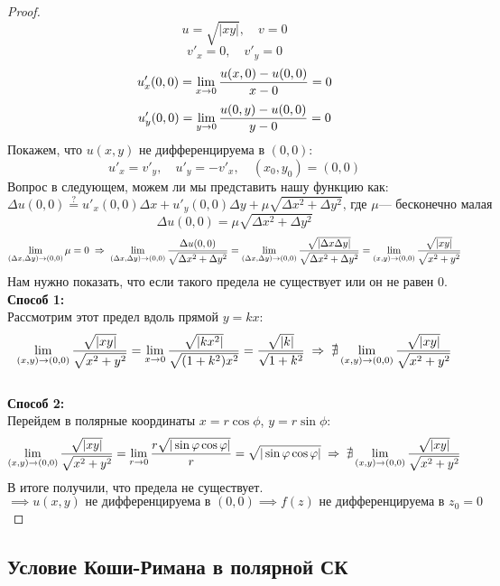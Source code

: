 	\begin{proof}
		\[ u = \sqrt{|xy|}, \quad v = 0 \]
		\[ v'_x = 0, \quad v'_y = 0 \]
		\[ u'_x(0, 0) = \lim\limits_{x \to 0}\frac{u(x, 0) - u(0, 0)}{x - 0} = 0 \]
		\[ u'_y(0, 0) = \lim\limits_{y \to 0}\frac{u(0, y) - u(0, 0)}{y - 0} = 0 \]
		Покажем, что $u(x,y)$ не дифференцируема в $(0, 0)$:
		\[ u'_x = v'_y, \quad u'_y = -v'_x, \quad (x_0, y_0) = (0, 0) \]
		Вопрос в следующем, можем ли мы представить нашу функцию как:
		\[ \Delta u(0, 0) \stackrel{?}{=} u'_x(0, 0)\Delta x + u'_y(0, 0)\Delta y + \mu \sqrt{\Delta x^2 + \Delta y^2} \text{, где } \mu \text{--- бесконечно малая}\]
		\[ \Delta u(0, 0) = \mu \sqrt{\Delta x^2 + \Delta y^2} \]
		\[\lim\limits_{(\Delta x, \Delta y) \to (0, 0) }\mu = 0  \;\Rightarrow\; \lim\limits_{(\Delta x, \Delta y) \to (0, 0) }\frac{\Delta u(0, 0)}{\sqrt{\Delta x^2 + \Delta y^2}} = \lim\limits_{(\Delta x, \Delta y) \to (0, 0) }\frac{\sqrt{|\Delta x \Delta y|}}{\sqrt{\Delta x^2 + \Delta y^2}} = \lim\limits_{( x,  y) \to (0, 0) }\frac{\sqrt{| x  y|}}{\sqrt{ x^2 +  y^2}}\]
		Нам нужно показать, что если такого предела не существует или он не равен 0.
		\newpage
		\noindent\textbf{Способ 1:}\\
		Рассмотрим этот предел вдоль прямой $y = kx$:
		\[ \lim\limits_{( x,  y) \to (0, 0) }\frac{\sqrt{| x  y|}}{\sqrt{ x^2 +  y^2}} = \lim\limits_{x \to 0 }\frac{\sqrt{| kx^2 |}}{\sqrt{ (1 +  k^2)x^2}} = \frac{\sqrt{| k |}}{\sqrt{ 1 +  k^2}}  \;\Rightarrow\; \nexists \lim\limits_{( x,  y) \to (0, 0) }\frac{\sqrt{| x  y|}}{\sqrt{ x^2 +  y^2}}\] \\
		\textbf{Способ 2:}\\
		Перейдем в полярные координаты $x = r \cos \phi$, $y = r \sin \phi$:
		\[ \lim\limits_{( x,  y) \to (0, 0) }\frac{\sqrt{| x  y|}}{\sqrt{ x^2 +  y^2}}  = \lim\limits_{r \to 0}\frac{r\sqrt{| \sin\varphi\cos\varphi|}}{r} = \sqrt{| \sin\varphi\cos\varphi|} \;\Rightarrow\;\nexists\lim\limits_{( x,  y) \to (0, 0) }\frac{\sqrt{| x  y|}}{\sqrt{ x^2 +  y^2}}\]
		В итоге получили, что предела не существует.
		\[\implies u(x, y) \text{ не дифференцируема в } (0, 0) \implies f(z) \text{ не дифференцируема в } z_0 = 0 \]
	\end{proof}
	\newpage
	\subsection{Условие Коши-Римана в полярной СК}
	
